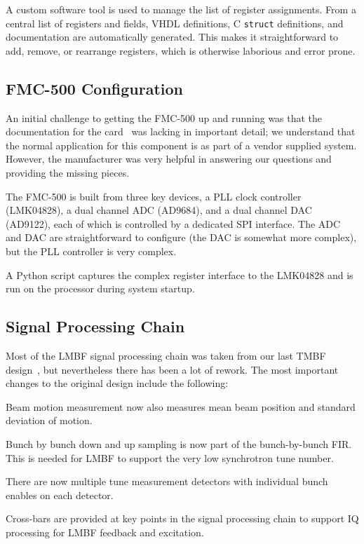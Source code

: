 \documentclass[
    a4paper,
    keeplastbox,            %
    hyphens,                %
]{jacow-2_1}
\begin{document}
A custom software tool is used to manage the list of register assignments.  From
a central list of registers and fields, VHDL definitions, C \texttt{struct}
definitions, and documentation are automatically generated.  This makes it
straightforward to add, remove, or rearrange registers, which is otherwise
laborious and error prone.


\subsection{FMC-500 Configuration}

An initial challenge to getting the FMC-500 up and running was that the
documentation for the card~\cite{fmc500} was lacking in important detail; we
understand that the normal application for this component is as part of a vendor
supplied system.  However, the manufacturer was very helpful in answering our
questions and providing the missing pieces.

The FMC-500 is built from three key devices, a PLL clock controller (LMK04828),
a dual channel ADC (AD9684), and a dual channel DAC (AD9122), each of which is
controlled by a dedicated SPI interface.  The ADC and DAC are straightforward to
configure (the DAC is somewhat more complex), but the PLL controller is very
complex.

A Python script captures the complex register interface to the LMK04828 and is
run on the processor during system startup.


\subsection{Signal Processing Chain}

Most of the LMBF signal processing chain was taken from our last TMBF
design~\cite{icalepcs2015}, but nevertheless there has been a lot of rework.
The most important changes to the original design include the following:

\begin{Itemize}
\item
    Beam motion measurement now also measures mean beam position and standard
    deviation of motion.
\item
    Bunch by bunch down and up sampling is now part of the bunch-by-bunch FIR.
    This is needed for LMBF to support the very low synchrotron tune number.
\item
    There are now multiple tune measurement detectors with individual bunch
    enables on each detector.
\item
    Cross-bars are provided at key points in the signal processing chain to
    support IQ processing for LMBF feedback and excitation.
\end{Itemize}
\end{document}
